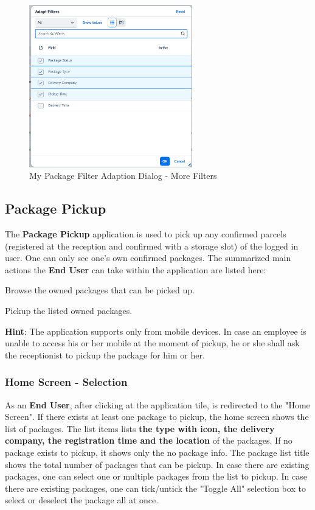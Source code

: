 \begin{figure}[H]
	\centering
	\includegraphics[height=200pt]{images/user_doc/myPack/MoreFIlterOption.png}
	\caption{My Package Filter Adaption Dialog - More Filters}
	\label{fig:mpMOreFilterAdaption}
\end{figure}
% 

\subsection{Package Pickup}
\label{subsec:pp}

The \textbf{Package Pickup} application is used to pick up any confirmed parcels (registered at the reception and confirmed with a storage slot) of the logged in user. One can only see one's own confirmed packages. 
The summarized main actions the \textbf{End User} can take within the application are listed here:

\begin{compactenum}
	\item Browse the owned packages that can be picked up.
    \item Pickup the listed owned packages.
\end{compactenum}

\bigskip
\textbf{Hint}: The application supports only from mobile devices. In case an employee is unable to access his or her mobile at the moment of pickup, he or she shall ask the receptionist to pickup the package for him or her.


\subsubsection{Home Screen - Selection}
As an \textbf{End User}, after clicking at the application tile, is redirected to the "Home Screen". If there exists at least one package to pickup, the home screen shows the list of packages. The list items lists \textbf{the type with icon, the delivery company, the registration time and the location} of the packages. If no package exists to pickup, it shows only the no package info. The package list title shows the total number of packages that can be pickup.
In case there are existing packages, one can select one or multiple packages from the list to pickup. 
In case there are existing packages, one can tick/untick the "Toggle All" selection box to select or deselect the package all at once. 

